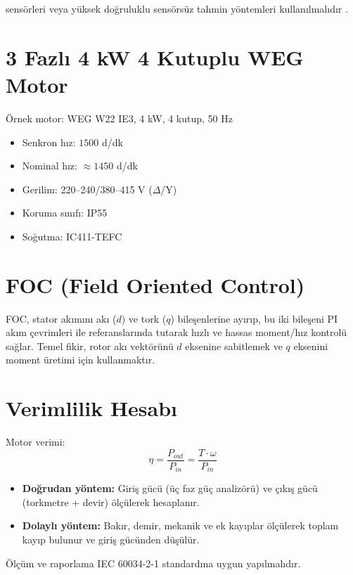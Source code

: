 sensörleri veya yüksek doğruluklu sensörsüz tahmin yöntemleri kullanılmalıdır \cite{macdonald1979dq}. \section{3 Fazlı 4 kW 4 Kutuplu WEG Motor} Örnek motor: WEG W22 IE3, 4 kW, 4 kutup, 50 Hz \begin{itemize} \item Senkron hız: $1500$ d/dk \item Nominal hız: $\approx 1450$ d/dk \item Gerilim: 220–240/380–415 V ($\Delta$/Y) \item Koruma sınıfı: IP55 \item Soğutma: IC411-TEFC \end{itemize} \section{FOC (Field Oriented Control)} FOC, stator akımını akı ($d$) ve tork ($q$) bileşenlerine ayırıp, bu iki bileşeni PI akım çevrimleri ile referanslarında tutarak hızlı ve hassas moment/hız kontrolü sağlar. Temel fikir, rotor akı vektörünü $d$ eksenine sabitlemek ve $q$ eksenini moment üretimi için kullanmaktır. \section{Verimlilik Hesabı} Motor verimi: \begin{equation} \eta = \frac{P_{out}}{P_{in}} = \frac{T \cdot \omega}{P_{in}} \end{equation} \begin{itemize} \item \textbf{Doğrudan yöntem:} Giriş gücü (üç faz güç analizörü) ve çıkış gücü (torkmetre + devir) ölçülerek hesaplanır. \item \textbf{Dolaylı yöntem:} Bakır, demir, mekanik ve ek kayıplar ölçülerek toplam kayıp bulunur ve giriş gücünden düşülür. \end{itemize} Ölçüm ve raporlama IEC 60034-2-1 standardına uygun yapılmalıdır.
    
\medskip




\clearpage
